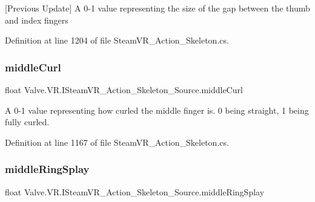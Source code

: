 \mbox{[}Previous Update\mbox{]} A 0-\/1 value representing the size of the gap between the thumb and index fingers 



Definition at line 1204 of file Steam\+V\+R\+\_\+\+Action\+\_\+\+Skeleton.\+cs.

\mbox{\label{interface_valve_1_1_v_r_1_1_i_steam_v_r___action___skeleton___source_ab1dd2b18c084b3a75008a1033312e417}} 
\subsubsection{\texorpdfstring{middleCurl}{middleCurl}}
{\footnotesize\ttfamily float Valve.\+V\+R.\+I\+Steam\+V\+R\+\_\+\+Action\+\_\+\+Skeleton\+\_\+\+Source.\+middle\+Curl\hspace{0.3cm}{\ttfamily [get]}}



A 0-\/1 value representing how curled the middle finger is. 0 being straight, 1 being fully curled. 



Definition at line 1167 of file Steam\+V\+R\+\_\+\+Action\+\_\+\+Skeleton.\+cs.

\mbox{\label{interface_valve_1_1_v_r_1_1_i_steam_v_r___action___skeleton___source_a82419b88ed43b9967ba432cb623ac65d}} 
\subsubsection{\texorpdfstring{middleRingSplay}{middleRingSplay}}
{\footnotesize\ttfamily float Valve.\+V\+R.\+I\+Steam\+V\+R\+\_\+\+Action\+\_\+\+Skeleton\+\_\+\+Source.\+middle\+Ring\+Splay\hspace{0.3cm}{\ttfamily [get]}}



